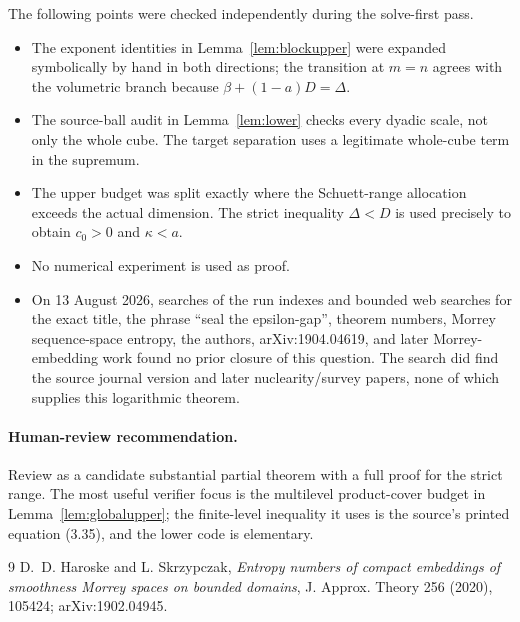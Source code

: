 \documentclass[11pt]{article}
\begin{document}
The following points were checked independently during the solve-first pass.

\begin{itemize}
\item The exponent identities in Lemma~\ref{lem:blockupper} were expanded
symbolically by hand in both directions; the transition at $m=n$ agrees with
the volumetric branch because $\beta+(1-a)D=\Delta$.
\item The source-ball audit in Lemma~\ref{lem:lower} checks every dyadic
scale, not only the whole cube.  The target separation uses a legitimate
whole-cube term in the supremum.
\item The upper budget was split exactly where the Schuett-range allocation
exceeds the actual dimension.  The strict inequality $\Delta<D$ is used
precisely to obtain $c_0>0$ and $\kappa<a$.
\item No numerical experiment is used as proof.
\item On 13 August 2026, searches of the run indexes and bounded web searches
for the exact title, the phrase ``seal the epsilon-gap'', theorem numbers,
Morrey sequence-space entropy, the authors, arXiv:1904.04619, and later
Morrey-embedding work found no prior closure of this question.  The search
did find the source journal version and later nuclearity/survey papers, none
of which supplies this logarithmic theorem.
\end{itemize}

\paragraph{Human-review recommendation.}
Review as a candidate substantial partial theorem with a full proof for the
strict range.  The most useful verifier focus is the multilevel product-cover
budget in Lemma~\ref{lem:globalupper}; the finite-level inequality it uses is
the source's printed equation (3.35), and the lower code is elementary.

{\small
\begin{thebibliography}{9}
D.~D. Haroske and L. Skrzypczak,
\emph{Entropy numbers of compact embeddings of smoothness Morrey spaces on
bounded domains}, J. Approx. Theory 256 (2020), 105424;
arXiv:1902.04945.
\end{thebibliography}
}
\end{document}
